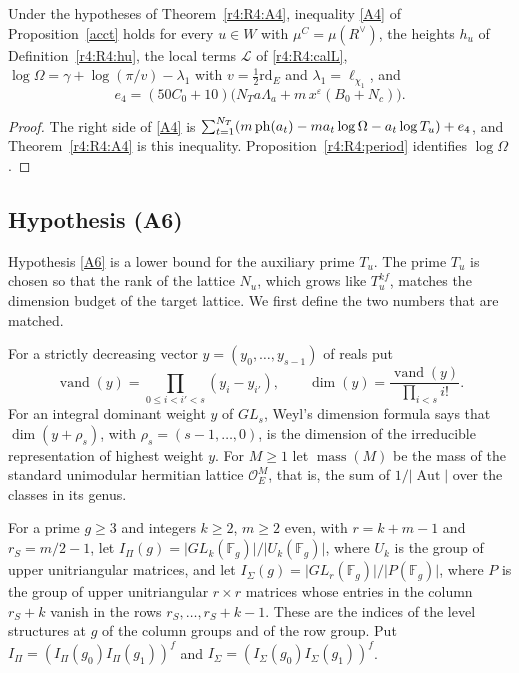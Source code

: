 \begin{corollary}\label{r4:R4:A4cor}
Under the hypotheses of Theorem~\ref{r4:R4:A4}, inequality \eqref{A4} of Proposition~\ref{acct} holds for every $u\in W$ with $\mu^C=\mu(R^\vee)$, the heights $h_u$ of Definition~\ref{r4:R4:hu}, the local terms $\mathcal L$ of \eqref{r4:R4:calL}, $\log\Omega=\gamma+\log(\pi/v)-\lambda_1$ with $v=\frac12\mathrm{rd}_E$ and $\lambda_1=\ell_{\chi_1}$, and
\[
e_4=(50C_0+10)\Big(N_Ta\Lambda_a+m\,x^\varepsilon(B_0+N_c)\Big).
\]
\end{corollary}

\begin{proof}
The right side of \eqref{A4} is $\sum_{t=1}^{N_T}(m\operatorname{ph}(a_t)-ma_t\log\Omega-a_t\log T_u)+e_4$, and Theorem~\ref{r4:R4:A4} is this inequality. Proposition~\ref{r4:R4:period} identifies $\log\Omega$.
\end{proof}

\subsection{Hypothesis (A6)}\label{r4:sec:R4A6}

Hypothesis \eqref{A6} is a lower bound for the auxiliary prime $T_u$. The prime $T_u$ is chosen so that the rank of the lattice $N_u$, which grows like $T_u^{kf}$, matches the dimension budget of the target lattice. We first define the two numbers that are matched.

For a strictly decreasing vector $y=(y_0,\dots,y_{s-1})$ of reals put
\[
\operatorname{vand}(y)=\prod_{0\le i<i'<s}(y_i-y_{i'}),\qquad \dim(y)=\frac{\operatorname{vand}(y)}{\prod_{i<s}i!} .
\]
For an integral dominant weight $y$ of $GL_s$, Weyl's dimension formula says that $\dim(y+\rho_s)$, with $\rho_s=(s-1,\dots,0)$, is the dimension of the irreducible representation of highest weight $y$. For $M\ge1$ let $\operatorname{mass}(M)$ be the mass of the standard unimodular hermitian lattice $\mathcal O_E^M$, that is, the sum of $1/\lvert\operatorname{Aut}\rvert$ over the classes in its genus.

For a prime $g\ge3$ and integers $k\ge2$, $m\ge2$ even, with $r=k+m-1$ and $r_S=m/2-1$, let $I_\Pi(g)=\lvert GL_k(\mathbb F_g)\rvert/\lvert U_k(\mathbb F_g)\rvert$, where $U_k$ is the group of upper unitriangular matrices, and let $I_\Sigma(g)=\lvert GL_r(\mathbb F_g)\rvert/\lvert P(\mathbb F_g)\rvert$, where $P$ is the group of upper unitriangular $r\times r$ matrices whose entries in the column $r_S+k$ vanish in the rows $r_S,\dots,r_S+k-1$. These are the indices of the level structures at $g$ of the column groups and of the row group. Put $I_\Pi=(I_\Pi(g_0)I_\Pi(g_1))^f$ and $I_\Sigma=(I_\Sigma(g_0)I_\Sigma(g_1))^f$.

